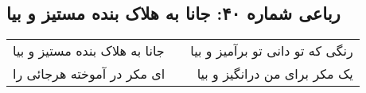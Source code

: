 \begin{center}
\section*{رباعی شماره ۴۰: جانا به هلاک بنده مستیز و بیا}
\label{sec:0040}
\begin{longtable}{l p{0.5cm} r}
جانا به هلاک بنده مستیز و بیا
&&
رنگی که تو دانی تو برآمیز و بیا
\\
ای مکر در آموخته هرجائی را
&&
یک مکر برای من درانگیز و بیا
\\
\end{longtable}
\end{center}
